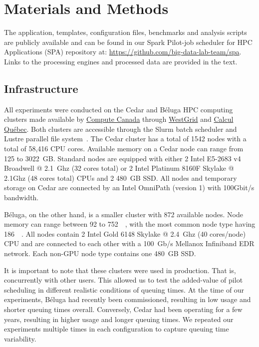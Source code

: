     \section{Materials and Methods}\label{spa:sec:methods}
    
	The application, templates, configuration files, benchmarks and analysis
	scripts are publicly available and can be found in our Spark Pilot-job
	scheduler for HPC Applications (SPA) repository at:
	\href{https://github.com/big-data-lab-team/spa}{https://github.com/big-data-lab-team/spa}.
	Links to the processing engines and processed data are provided in the
	text.
	
	\subsection{Infrastructure}
	All experiments were conducted on the Cedar and B\'eluga HPC computing
	clusters made available by \href{https://www.computecanada.ca}{Compute
	Canada} through \href{https://www.westgrid.ca}{WestGrid} and
	\href{http://www.calculquebec.ca}{Calcul Qu\'ebec}. Both clusters are
	accessible through the Slurm batch scheduler and Lustre parallel file
	system~\cite{schwan2003lustre}. The Cedar cluster has a total of 1542
	nodes with a total of 58,416 CPU cores. Available memory on a Cedar node
	can range from 125 to 3022~GB. Standard nodes are equipped with either 2
	Intel E5-2683 v4 Broadwell @ 2.1~Ghz (32 cores total) or 2 Intel
	Platinum 8160F Skylake @ 2.1Ghz (48 cores total) CPUs and 2 480~GB SSD.
	All nodes and temporary storage on Cedar are connected by an Intel
	OmniPath (version 1) with 100Gbit/s bandwidth.
    
	B\'eluga, on the other hand, is a smaller cluster with 872 available
	nodes. Node memory can range between 92 to \SI{752}{\giga\byte}, with
	the most common node type having \SI{186}{\giga\byte}. All nodes contain
	2 Intel Gold 6148 Skylake @ 2.4~Ghz (40 cores/node) CPU and are
	connected to each other with a 100~Gb/s Mellanox Infiniband EDR network.
	Each non-GPU node type contains one 480~GB SSD. 
    
	It is important to note that these clusters were used in production.
	That is, concurrently with other users. This allowed us to test the
	added-value of pilot scheduling in different realistic conditions of
	queuing times. At the time of our experiments, B\'eluga had recently
	been commissioned, resulting in low usage and shorter queuing times
	overall. Conversely, Cedar had been operating for a few years, resulting
	in higher usage and longer queuing times. We repeated our experiments
	multiple times in each configuration to capture queuing time
	variability.
    
